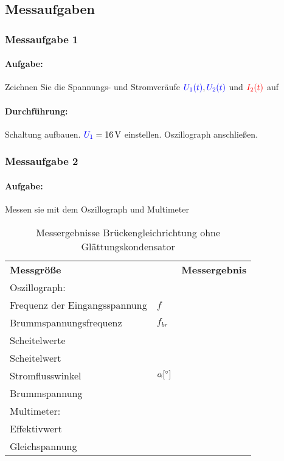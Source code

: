 \documentclass[11pt,a4paper,titlepage]{scrreprt}
\begin{document}
			\subsection{Messaufgaben}
			\subsubsection{Messaufgabe 1}
			\paragraph{Aufgabe:} Zeichnen Sie die Spannungs- und Stromveräufe $\textcolor{blue}{U_1(t)}, \textcolor{blue}{U_2(t)}$ und $\textcolor{red}{I_2(t)}$ auf
			\paragraph{Durchführung:}  Schaltung aufbauen. $\textcolor{blue}{U_1} = \SI{16}{\volt}$  einstellen. Oszillograph anschließen.\\
			
			
			\subsubsection{Messaufgabe 2}
			\paragraph{Aufgabe:} Messen sie mit dem Oszillograph und Multimeter
			\begin{table}[!hbtp]
				\caption{Messergebnisse Brückengleichrichtung ohne Glättungskondensator}
				\label{tbl:messergebnisse2.1}
				\renewcommand{\arraystretch}{1.3}
				\begin{tabular}{ll|l}
					\multicolumn{2}{l}{\textbf{Messgröße}} & \textbf{Messergebnis}\\
                                                \multicolumn{3}{l}{Oszillograph:}\\\hline
					Frequenz der Eingangsspannung & $f$ & \\
					Brummspannungsfrequenz & $f_{br}$ & \\
					Scheitelwerte & \spannung{$U_{1_{max}}$} & \\
					Scheitelwert & \spannung{$U_{2_{max}}$} &\\
					Stromflusswinkel &  $\alpha [ \degree]$& \\
					Brummspannung &  \spannung{$U_{brmax}$} &\\
                                                \multicolumn{3}{l}{Multimeter:}\\\hline
					Effektivwert & \spannung{$U_{1}$} &\\
					Gleichspannung & \spannung{$U_{2-}$} & \\
				\end{tabular}
			\end{table}
        
\end{document}
